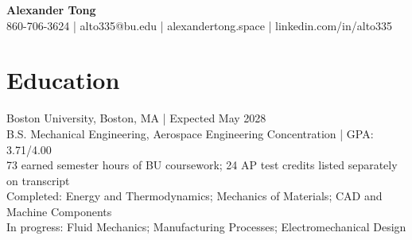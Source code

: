 \documentclass[letterpaper,10pt]{article}
\begin{document}
{\LARGE\textbf{Alexander Tong}}\\
860-706-3624 | alto335@bu.edu | alexandertong.space | linkedin.com/in/alto335\\
\section*{Education}
Boston University, Boston, MA | Expected May 2028\\
B.S. Mechanical Engineering, Aerospace Engineering Concentration | GPA: 3.71/4.00\\
73 earned semester hours of BU coursework; 24 AP test credits listed separately on transcript\\
Completed: Energy and Thermodynamics; Mechanics of Materials; CAD and Machine Components\\
In progress: Fluid Mechanics; Manufacturing Processes; Electromechanical Design\\
\end{document}
